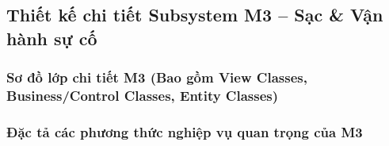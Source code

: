 \subsection{Thiết kế chi tiết Subsystem M3 – Sạc \& Vận hành sự cố}

\subsubsection{Sơ đồ lớp chi tiết M3 (Bao gồm View Classes, Business/Control Classes, Entity Classes)}


\subsubsection{Đặc tả các phương thức nghiệp vụ quan trọng của M3}

